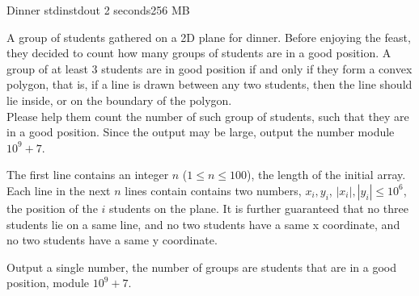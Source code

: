 \begin{problem}{Dinner}
{stdin}{stdout}
{2 seconds}{256 MB}{}

A group of students gathered on a 2D plane for dinner. Before enjoying the feast, they decided to count how many groups of students are in a good position. A group of at least 3 students are in good position if and only if they form a convex polygon, that is, if a line is drawn between any two students, then the line should lie inside, or on the boundary of the polygon. \\
Please help them count the number of such group of students, such that they are in a good position. Since the output may be large, output the number module $10^9 + 7$.

\InputFile
The first line contains an integer $n$ ($1 \leq n \leq 100$), the length of the initial array. Each line in the next $n$ lines contain contains two numbers, $x_i, y_i$, $|x_i|, |y_i| \leq 10^6$, the position of the $i$ students on the plane. It is further guaranteed that no three students lie on a same line, and no two students have a same x coordinate, and no two students have a same y coordinate.

\OutputFile

Output a single number, the number of groups are students that are in a good position, module $10^9 + 7$.

\Examples

\begin{example}
%
\end{example}

\begin{example}
%
\end{example}

\begin{example}
%
\end{example}

\end{problem}

